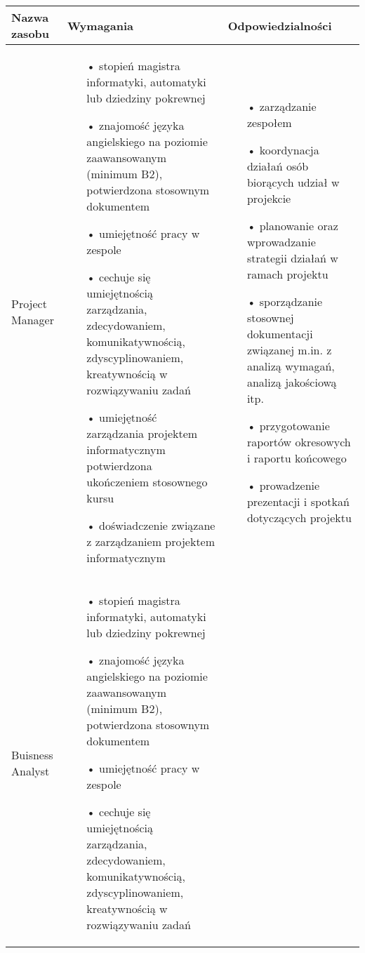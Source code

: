 \begin{center}
    \begin{tabular}{ | l | p{5cm} | p{5cm} |}
    \hline
    Nazwa zasobu & Wymagania & Odpowiedzialności \\ \hline
    Project Manager & 
    \begin{itemize}
	\item[•] stopień magistra informatyki, automatyki lub dziedziny pokrewnej 
	\item[•] znajomość języka angielskiego na poziomie zaawansowanym (minimum B2), potwierdzona stosownym dokumentem
	\item[•] umiejętność pracy w zespole
	\item[•] cechuje się  umiejętnością zarządzania,  zdecydowaniem, komunikatywnością, zdyscyplinowaniem, kreatywnością w rozwiązywaniu zadań 
	\item[•] umiejętność zarządzania projektem informatycznym potwierdzona ukończeniem stosownego kursu 
	\item[•] doświadczenie związane z zarządzaniem projektem informatycznym
	\end{itemize}	    	
     & 
	\begin{itemize}
	\item[•] zarządzanie zespołem
	\item[•] koordynacja działań osób biorących udział w projekcie
	\item[•] planowanie oraz wprowadzanie strategii działań w ramach projektu
	\item[•] sporządzanie stosownej dokumentacji związanej m.in. z analizą wymagań, analizą jakościową itp.
	\item[•] przygotowanie raportów okresowych i raportu końcowego
	\item[•] prowadzenie prezentacji i spotkań dotyczących projektu
	\end{itemize}	   
	\\ \hline
    Buisness Analyst & 
    \begin{itemize}
	\item[•] stopień magistra informatyki, automatyki lub dziedziny pokrewnej 
	\item[•] znajomość języka angielskiego na poziomie zaawansowanym (minimum B2), potwierdzona stosownym dokumentem
	\item[•] umiejętność pracy w zespole
	\item[•] cechuje się  umiejętnością zarządzania,  zdecydowaniem, komunikatywnością, zdyscyplinowaniem, kreatywnością w rozwiązywaniu zadań 

\end{itemize}
\end{tabular}
\end{center}
